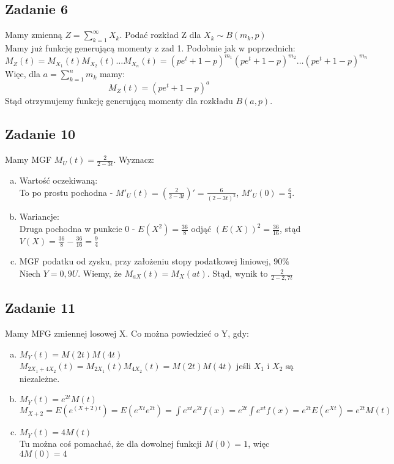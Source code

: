 \documentclass[a4paper]{article}
\begin{document}
\subsection*{Zadanie 6}
Mamy zmienną $Z=\sum\limits_{k=1}^\infty X_k$. Podać rozkład Z dla $X_k \sim B(m_k, p)$\\

Mamy już funkcję generującą momenty z zad 1. Podobnie jak w poprzednich:\\
$$M_Z(t)=M_{X_1}(t)M_{X_2}(t)\dots M_{X_n}(t) = (pe^t + 1-p)^{m_1} (pe^t + 1-p)^{m_2} \dots (pe^t + 1-p)^{m_n}$$
Więc, dla $a=\sum_{k=1}^n m_k$ mamy:
$$M_Z(t)=(pe^t + 1-p)^a$$
Stąd otrzymujemy funkcję generującą momenty dla rozkładu $B(a,p)$.

\subsection*{Zadanie 10}
Mamy MGF $M_U(t) = \frac{2}{2-3t}$. Wyznacz:
\begin{enumerate}[a)]
\item Wartość oczekiwaną:\\
To po prostu pochodna - $M'_U(t)=\left(\frac{2}{2-3t}\right)' = \frac{6}{(2-3t)^2}$, $M'_U(0)=\frac{6}{4}$.
\item Wariancje:\\
Druga pochodna w punkcie 0 - $E(X^2)=\frac{36}{8}$ odjąć $(E(X))^2 = \frac{36}{16}$, stąd $V(X)=\frac{36}{8} - \frac{36}{16} = \frac{9}{4}$
\item MGF podatku od zysku, przy założeniu stopy podatkowej liniowej, $90\%$\\
Niech $Y=0,9U$. Wiemy, że $M_{aX}(t)=M_X(at)$. Stąd, wynik to $\frac{2}{2-2,7t}$
\end{enumerate}
\subsection*{Zadanie 11}
Mamy MFG zmiennej losowej X. Co można powiedzieć o Y, gdy:

\begin{enumerate}[a)]
\item $M_Y(t)=M(2t)M(4t)$\\
$M_{2X_1 + 4X_2}(t) = M_{2X_1}(t)M_{4X_2}(t) = M(2t)M(4t)$ jeśli $X_1$ i $X_2$ są niezależne.
\item $M_Y(t)=e^{2t}M(t)$\\
$M_{X+2}=E(e^{(X+2)t}) = E(e^{Xt}e^{2t}) = \int e^{xt}e^{2t} f(x) = e^{2t}\int e^{xt}f(x)=e^{2t}E(e^{Xt})=e^{2t}M(t)$
\item $M_Y(t)=4M(t)$\\
Tu można coś pomachać, że dla dowolnej funkcji $M(0)=1$, więc $4M(0)=4$
\end{enumerate}
\end{document}
